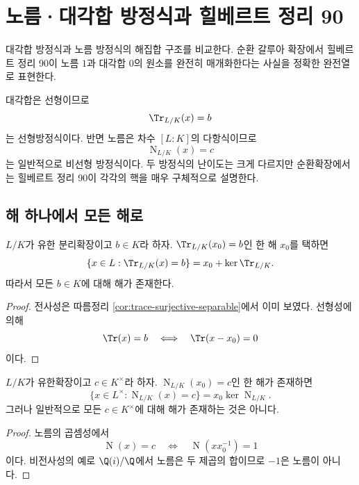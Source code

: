 \clearpage
\section{노름·대각합 방정식과 힐베르트 정리 90}
\label{sec:norm-trace-equations-hilbert90}

\begin{learninggoal}
대각합 방정식과 노름 방정식의 해집합 구조를 비교한다. 순환 갈루아 확장에서 힐베르트 정리 90이 노름 $1$과 대각합 $0$의 원소를 완전히 매개화한다는 사실을 정확한 완전열로 표현한다.
\end{learninggoal}

대각합은 선형이므로
\[
  \Tr_{L/K}(x)=b
\]
는 선형방정식이다. 반면 노름은 차수 $[L:K]$의 다항식이므로
\[
  \operatorname N_{L/K}(x)=c
\]
는 일반적으로 비선형 방정식이다. 두 방정식의 난이도는 크게 다르지만 순환확장에서는 힐베르트 정리 90이 각각의 핵을 매우 구체적으로 설명한다.

\subsection{해 하나에서 모든 해로}

\begin{proposition}
\label{prop:trace-equation-solution-coset}
$L/K$가 유한 분리확장이고 $b\in K$라 하자. $\Tr_{L/K}(x_0)=b$인 한 해 $x_0$를 택하면
\[
  \{x\in L:\Tr_{L/K}(x)=b\}
  =x_0+\ker\Tr_{L/K}.
\]
따라서 모든 $b\in K$에 대해 해가 존재한다.
\end{proposition}

\begin{proof}
전사성은 따름정리 \ref{cor:trace-surjective-separable}에서 이미 보였다. 선형성에 의해
\[
  \Tr(x)=b
  \quad\Longleftrightarrow\quad
  \Tr(x-x_0)=0
\]
이다.
\end{proof}

\begin{proposition}[노름 방정식]
\label{prop:norm-equation-solution-coset}
$L/K$가 유한확장이고 $c\in K^\times$라 하자. $\operatorname N_{L/K}(x_0)=c$인 한 해가 존재하면
\[
  \{x\in L^\times:\operatorname N_{L/K}(x)=c\}
  =x_0\ker\operatorname N_{L/K}.
\]
그러나 일반적으로 모든 $c\in K^\times$에 대해 해가 존재하는 것은 아니다.
\end{proposition}

\begin{proof}
노름의 곱셈성에서
\[
  \operatorname N(x)=c
  \quad\Longleftrightarrow\quad
  \operatorname N(xx_0^{-1})=1
\]
이다. 비전사성의 예로 $\Q(i)/\Q$에서 노름은 두 제곱의 합이므로 $-1$은 노름이 아니다.
\end{proof}

